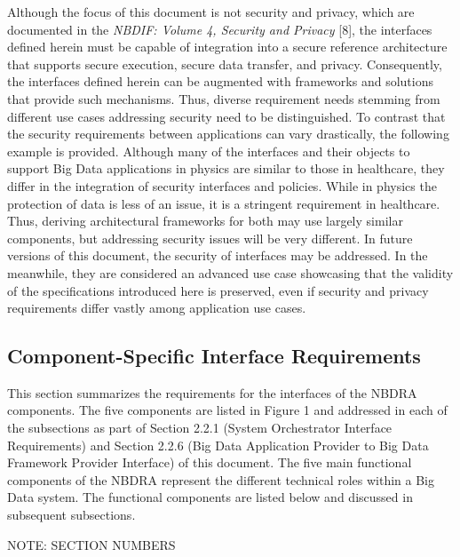 \documentclass[9pt,]{article}
\newenvironment{Shaded}{}{}
\newcommand{\ExtensionTok}[1]{#1}
\newcommand{\NormalTok}[1]{#1}
\begin{document}
Although the focus of this document is not security and privacy, which
are documented in the \emph{NBDIF: Volume 4, Security and Privacy}
{[}8{]}, the interfaces defined herein must be capable of integration
into a secure reference architecture that supports secure execution,
secure data transfer, and privacy. Consequently, the interfaces defined
herein can be augmented with frameworks and solutions that provide such
mechanisms. Thus, diverse requirement needs stemming from different use
cases addressing security need to be distinguished. To contrast that the
security requirements between applications can vary drastically, the
following example is provided. Although many of the interfaces and their
objects to support Big Data applications in physics are similar to those
in healthcare, they differ in the integration of security interfaces and
policies. While in physics the protection of data is less of an issue,
it is a stringent requirement in healthcare. Thus, deriving
architectural frameworks for both may use largely similar components,
but addressing security issues will be very different. In future
versions of this document, the security of interfaces may be addressed.
In the meanwhile, they are considered an advanced use case showcasing
that the validity of the specifications introduced here is preserved,
even if security and privacy requirements differ vastly among
application use cases.

\hypertarget{component-specific-interface-requirements}{%
\subsection{Component-Specific Interface
Requirements}\label{component-specific-interface-requirements}}

This section summarizes the requirements for the interfaces of the NBDRA
components. The five components are listed in Figure 1 and addressed in
each of the subsections as part of Section 2.2.1 (System Orchestrator
Interface Requirements) and Section 2.2.6 (Big Data Application Provider
to Big Data Framework Provider Interface) of this document. The five
main functional components of the NBDRA represent the different
technical roles within a Big Data system. The functional components are
listed below and discussed in subsequent subsections.

\begin{Shaded}
\begin{Highlighting}[]
\ExtensionTok{NOTE}\NormalTok{: SECTION NUMBERS}
\end{Highlighting}
\end{Shaded}
\end{document}
